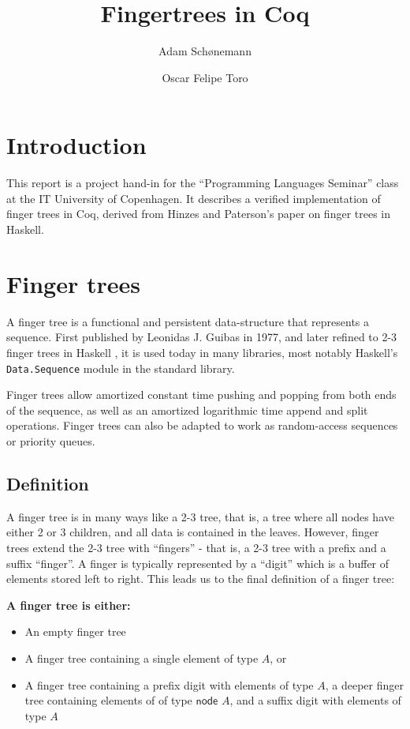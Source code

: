 \documentclass{article}
\title{Fingertrees in Coq}
\author{Adam Schønemann\\ \code{adsc@itu.dk} \and Oscar Felipe Toro \\ \code{osto@itu.dk}}
\date{}
\newcommand{\code}[1]{\texttt{#1}}
\begin{document}
% 
\tableofcontents
\pagestyle{fancy}
\maketitle
\thispagestyle{fancy}
\section{Introduction}
This report is a project hand-in for the ``Programming Languages Seminar'' class at
the IT University of Copenhagen.
It describes a verified implementation of finger trees in Coq, derived from
Hinzes and Paterson's paper on finger trees in Haskell\cite{Hinze-Paterson:FingerTree}.

\section{Finger trees}
A finger tree is a functional and persistent data-structure that represents a sequence.
First published by Leonidas J. Guibas in 1977\cite{guibas1977new},
and later refined to 2-3 finger trees in Haskell \cite{Hinze-Paterson:FingerTree},
it is used today in many libraries, most notably Haskell's \code{Data.Sequence}
module in the standard library.

Finger trees allow amortized constant time pushing and popping from both ends of the
sequence, as well as an amortized logarithmic time append and split operations.
Finger trees can also be adapted to work as random-access sequences or priority queues.

\subsection{Definition}
A finger tree is in many ways like a 2-3 tree, that is, a tree where all nodes have
either 2 or 3 children, and all data is contained in the leaves. However, finger trees
extend the 2-3 tree with ``fingers'' - that is, a 2-3 tree with a prefix and a suffix ``finger''. A finger is typically represented by a ``digit'' which is a buffer of
elements stored left to right. This leads us to the final definition of a finger tree:

\textbf{A finger tree is either:}
\begin{itemize}
\item An empty finger tree
\item A finger tree containing a single element of type $A$, or
\item A finger tree containing a prefix digit with elements of type $A$, a deeper finger tree containing elements of of type $\textsf{node } A$, and a suffix digit with
elements of type $A$
\end{itemize}
\end{document}
